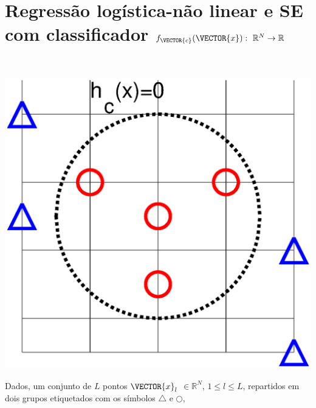 \newpage

\section{Regressão logística-não linear e SE com classificador $f_{\VECTOR{c}}(\VECTOR{x}):~\mathbb{R}^{N} \rightarrow \mathbb{R}$}
\label{sec:theo:reglogrnr1nolinear:1}


\begin{theorem}\label{theo:reglogrnr1nolinear:1}
~\\
\noindent
\begin{minipage}{0.45\textwidth}
\centering
\includegraphics[width=0.95\linewidth]{chapters/classificacao/mfiles/reglogrnr1nolinear/reglogrnr1nolinear.eps} 
\end{minipage}
\begin{minipage}{0.55\textwidth}
Dados, um conjunto de $L$ pontos
$\VECTOR{x}_l$ $\in \mathbb{R}^{N}$, $1\leq l \leq L$,
repartidos em dois grupos etiquetados com os símbolos $\bigtriangleup$ e $\bigcirc$,

\end{minipage}
\end{theorem}
